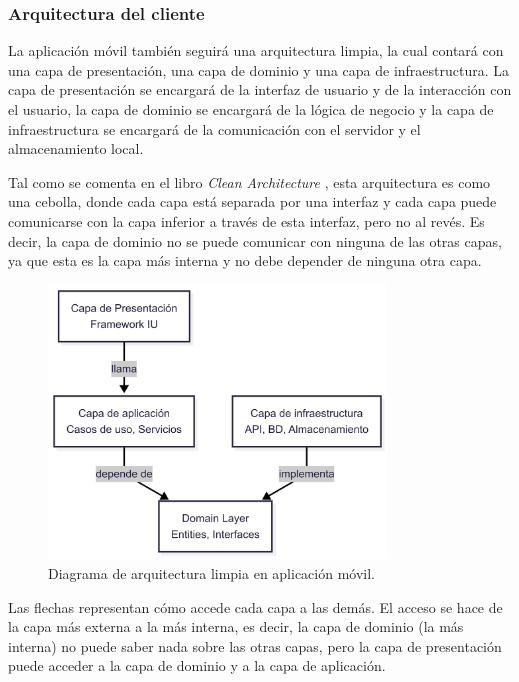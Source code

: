 \subsubsection{Arquitectura del cliente}
La aplicación móvil también seguirá una arquitectura limpia, la cual contará con una capa de presentación, una capa de dominio y una capa de infraestructura.
La capa de presentación se encargará de la interfaz de usuario y de la interacción con el usuario, la capa de dominio se encargará de la lógica de negocio y la capa de infraestructura se encargará de la comunicación con el servidor y el almacenamiento local.

Tal como se comenta en el libro \textit{Clean Architecture} \parencite{uncle-bob-clean-architecture}, esta arquitectura es como una cebolla, donde cada capa está separada por una interfaz y cada capa puede comunicarse con la capa inferior a través de esta interfaz, pero no al revés.
Es decir, la capa de dominio no se puede comunicar con ninguna de las otras capas, ya que esta es la capa más interna y no debe depender de ninguna otra capa.


\begin{figure}[H]
  \centering
  \includegraphics[width=0.8\textwidth]{assets/clean-architecture-mobile.png}
  \caption{Diagrama de arquitectura limpia en aplicación móvil.}
  \label{fig:clean-architecture-mobile}
\end{figure}

Las flechas representan cómo accede cada capa a las demás.
El acceso se hace de la capa más externa a la más interna, es decir, la capa de dominio (la más interna) no puede saber nada sobre las otras capas, pero la capa de presentación puede acceder a la capa de dominio y a la capa de aplicación.

